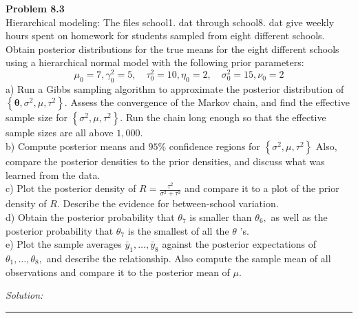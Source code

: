 \documentclass[a4paper, 11pt]{article}
\newenvironment{problem}[2][Problem]
    { \begin{mdframed}[backgroundcolor=gray!20] \textbf{#1 #2} \\}
    {  \end{mdframed}}
\newenvironment{solution}
    {\textit{Solution:}}
    {}
\begin{document}
\begin{problem}{8.3}
Hierarchical modeling: The files school1. dat through school8. dat give weekly hours spent on homework for students sampled from eight different schools. Obtain posterior distributions for the true means for the eight different schools using a hierarchical normal model with the following prior parameters:
$$
\mu_{0}=7, \gamma_{0}^{2}=5, \quad \tau_{0}^{2}=10, \eta_{0}=2, \quad \sigma_{0}^{2}=15, \nu_{0}=2
$$
a) Run a Gibbs sampling algorithm to approximate the posterior distribution of $\left\{\boldsymbol{\theta}, \sigma^{2}, \mu, \tau^{2}\right\} .$ Assess the convergence of the Markov chain, and find the effective sample size for $\left\{\sigma^{2}, \mu, \tau^{2}\right\} .$ Run the chain long enough so that the effective sample sizes are all above $1,000$.\\
b) Compute posterior means and $95 \%$ confidence regions for $\left\{\sigma^{2}, \mu, \tau^{2}\right\}$ Also, compare the posterior densities to the prior densities, and discuss what was learned from the data.\\
c) Plot the posterior density of $R=\frac{\tau^{2}}{\sigma^{2}+\tau^{2}}$ and compare it to a plot of the prior density of $R .$ Describe the evidence for between-school variation.\\
d) Obtain the posterior probability that $\theta_{7}$ is smaller than $\theta_{6},$ as well as the posterior probability that $\theta_{7}$ is the smallest of all the $\theta$ 's.\\
e) Plot the sample averages $\bar{y}_{1}, \ldots, \bar{y}_{8}$ against the posterior expectations of $\theta_{1}, \ldots, \theta_{8},$ and describe the relationship. Also compute the sample mean of all observations and compare it to the posterior mean of $\mu$.

\end{problem}
\begin{solution}



\end{solution} 
\noindent\rule{7in}{2.8pt}



\end{document}
